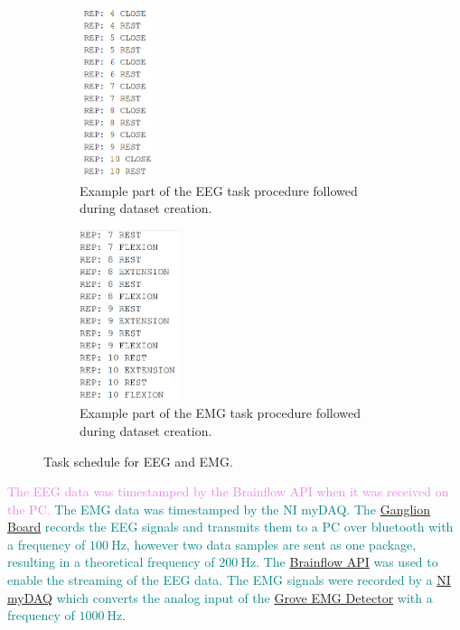 \begin{figure}
	\centering
    \begin{subfigure}[b]{0.45\columnwidth}
		\centering
		\includegraphics[height=5cm]{figures/eeg_task.png}
		\caption{Example part of the EEG task procedure followed during dataset creation.}
		\label{fig:eeg_task}
	\end{subfigure}	
    \begin{subfigure}[b]{0.45\columnwidth}
		\centering
		\includegraphics[height=5cm]{figures/emg_task.png}
		\caption{Example part of the EMG task procedure followed during dataset creation.}
		\label{fig:emg_task}
	\end{subfigure}
	\hfill
	\caption{Task schedule for EEG and EMG.}
	\label{fig:task_schedule}
\end{figure}


\textcolor{violet}{The EEG data was timestamped by the Brainflow API when it was received on the PC.}
\textcolor{teal}{The EMG data was timestamped by the NI myDAQ.}
\textcolor{teal}{The \href{https://docs.openbci.com/Ganglion/GanglionLanding/}{Ganglion Board} records the EEG signals and transmits them to a PC over bluetooth with a frequency of $100\:\text{Hz}$, however two data samples are sent as one package, resulting in a theoretical frequency of $200\:\text{Hz}$\:\cite{OpenBCI2023}. The \href{https://brainflow.readthedocs.io/en/stable/index.html}{Brainflow API} was used to enable the streaming of the EEG data.}
\textcolor{teal}{The EMG signals were recorded by a \href{https://www.ni.com/en/shop/engineering-education/portable-student-devices/mydaq/what-is-mydaq.html}{NI myDAQ} which converts the analog input of the \href{https://wiki.seeedstudio.com/Grove-EMG_Detector/}{Grove EMG Detector} with a frequency of $1000\:\text{Hz}$.}

